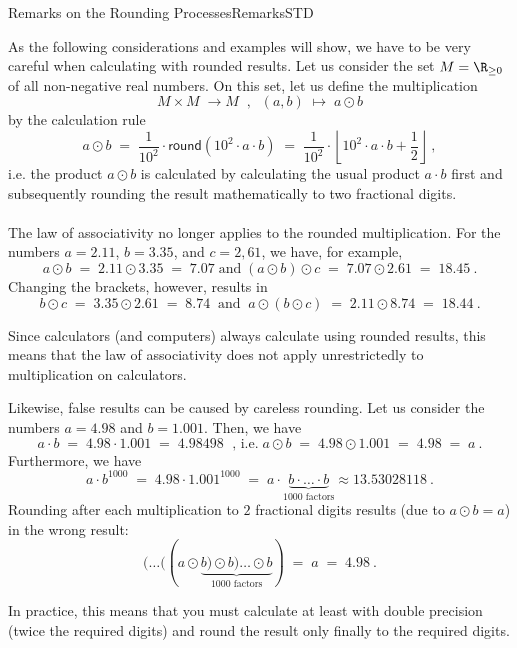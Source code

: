 \begin{MXContent}{Remarks on the Rounding Processes}{Remarks}{STD}

As the following considerations and examples will show, we have to be very careful when calculating with rounded results. 
Let us consider the set $M=\R_{\geq0}$ of all non-negative real numbers. On this set, let us define the 
multiplication
$$
M\times M \;\longrightarrow M\;\; , \;\;
(a,b)\;\longmapsto\; a\odot b
$$
by the calculation rule
$$
a\odot b \; =\; \frac{1}{10^{2}}\cdot \textsf{round}( 10^{2}\cdot a \cdot b)\; =\; \frac{1}{10^{2}}\cdot \left\lfloor{ 10^{2}\cdot a \cdot b + \frac{1}{2} }\right\rfloor\: ,
$$
i.e. the product $a\odot b$ is calculated by calculating the usual product $a\cdot b$ first and subsequently rounding the result mathematically 
to two fractional digits.
\ \\ \ \\
The law of associativity no longer applies to the rounded multiplication. For the numbers 
$a=2.11$, $b=3.35$, and $c=2,61$, we have, for example,
$$
a\odot b \;=\; 2.11 \odot 3.35 \; =\; 7.07\;\text{and}\;
(a\odot b)\odot c \; =\; 7.07 \odot 2.61 \;=\;  18.45\: .
$$
Changing the brackets, however, results in
$$
b\odot c\;  =\; 3.35 \odot 2.61 \; =\; 8.74\;\;\text{and}\;\;a\odot (b\odot c)\; =\;2.11 \odot 8.74 \;=\; 18.44\: .
$$

\begin{MInfo}
Since calculators (and computers) always calculate using rounded results, this means that the 
law of associativity does not apply unrestrictedly to multiplication on calculators.
\end{MInfo}

Likewise, false results can be caused by careless rounding. Let us consider the numbers $a=4.98$ and $b=1.001$. Then, we have
$$
a\cdot b\; =\; 4.98 \cdot 1.001\; =\; 4.98498\;\text{ , i.e.}\;
a\odot b \; =\; 4.98 \odot 1.001\; =\; 4.98\; =\; a\: .
$$
Furthermore, we have
$$
a\cdot b^{1000}\; =\; 4.98 \cdot 1.001^{1000} \;=\; a\cdot \underbrace{b\cdot \ldots \cdot b}_{1000 \text{ factors}} \approx 13.53028118\: .
$$
Rounding after each multiplication to $2$ fractional digits results (due to $a\odot b=a$) in the wrong result:
$$
(\ldots ((a\odot \underbrace{b) \odot b) \ldots \odot b}_{1000 \text{ factors}}) \;=\;  a\; =\;4.98 \: .
$$

\begin{MInfo}
In practice, this means that you must calculate at least with double precision (twice the required digits) and round the result only finally 
to the required digits.
\end{MInfo}

\end{MXContent}

